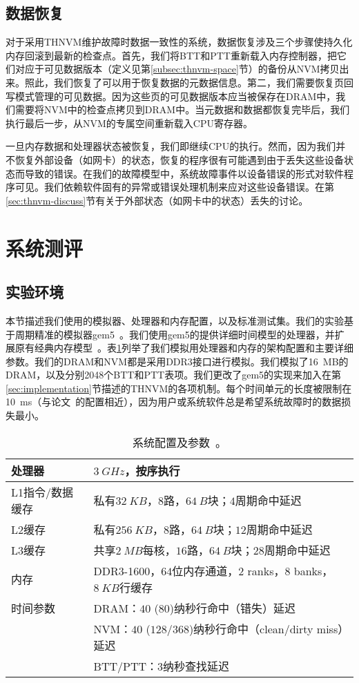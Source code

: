 \subsection{数据恢复} 
对于采用THNVM维护故障时数据一致性的系统，数据恢复涉及三个步骤使持久化内存回滚到最新的检查点。首先，我们将BTT和PTT重新载入内存控制器，把它们对应于可见数据版本（定义见第\ref{subsec:thnvm-space}节）的备份从NVM拷贝出来。照此，我们恢复了可以用于恢复数据的元数据信息。第二，我们需要恢复页回写模式管理的可见数据。因为这些页的可见数据版本应当被保存在DRAM中，我们需要将NVM中的检查点拷贝到DRAM中。当元数据和数据都恢复完毕后，我们执行最后一步，从NVM的专属空间重新载入CPU寄存器。 

一旦内存数据和处理器状态被恢复，我们即继续CPU的执行。然而，因为我们并不恢复外部设备（如网卡）的状态，恢复的程序很有可能遇到由于丢失这些设备状态而导致的错误。在我们的故障模型中，系统故障事件以设备错误的形式对软件程序可见。我们依赖软件固有的异常或错误处理机制来应对这些设备错误。在第\ref{sec:thnvm-discuss}节有关于外部状态（如网卡中的状态）丢失的讨论。 

\section{系统测评}
\label{sec:thnvm-eval}

\subsection{实验环境}

本节描述我们使用的模拟器、处理器和内存配置，以及标准测试集。我们的实验基于周期精准的模拟器gem5~\cite{Binkert:2011:GS:2024716.2024718}。我们使用gem5的提供详细时间模型的处理器，并扩展原有经典内存模型~\cite{6844484}。表\ref{table:config}列举了我们模拟用处理器和内存的架构配置和主要详细参数。我们的DRAM和NVM都是采用DDR3接口进行模拟。我们模拟了16~MB的DRAM，以及分别2048个BTT和PTT表项。我们更改了gem5的实现来加入在第\ref{sec:implementation}节描述的THNVM的各项机制。每个时间单元的长度被限制在10~ms（与论文~\cite{1003567, 1003568}的配置相近），因为用户或系统软件总是希望系统故障时的数据损失最小。 

\begin{table}[!ht]
\centering
\caption{系统配置及参数~\cite{Lee:2009:APC:1555754.1555758}。}
\label{table:config}
\begin{tabular}{l|l}
\toprule[1.5pt]
处理器 & $3~GHz$，按序执行 \\
\hline
L1指令/数据缓存 & 私有$32~KB$，$8$路，$64~B$块；$4$周期命中延迟 \\
L2缓存 & 私有$256~KB$，$8$路，$64~B$块；$12$周期命中延迟 \\
L3缓存 & 共享$2~MB$每核，$16$路，$64~B$块；$28$周期命中延迟 \\
\hline
内存 & DDR3-1600，$64$位内存通道，$2$ ranks，$8$ banks，$8~KB$行缓存 \\
时间参数 & DRAM：$40$ ($80$)纳秒行命中（错失）延迟 \\
               & NVM：$40$ ($128$/$368$)纳秒行命中（clean/dirty miss）延迟 \\
               & BTT/PTT：$3$纳秒查找延迟 \\
\toprule[1.5pt]
\end{tabular}
\end{table}

